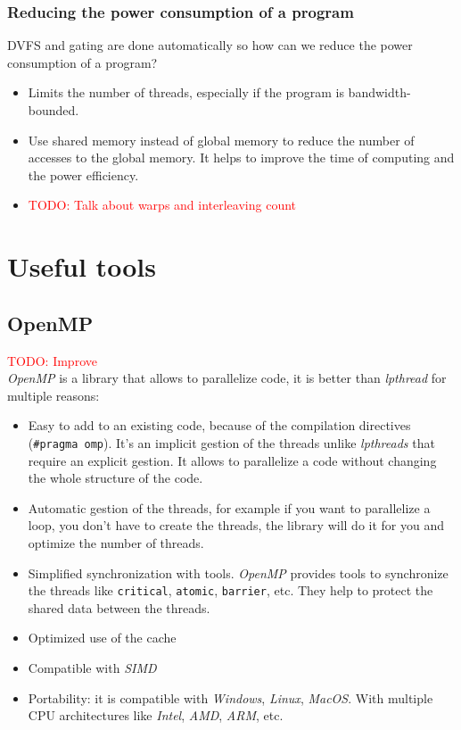 \documentclass[12pt, openany]{report}
\theoremstyle{definition}
\begin{document}
\subsection{Reducing the power consumption of a program}
DVFS and gating are done automatically so how can we reduce the power consumption of a program? 
\begin{itemize}
	\item Limits the number of threads, especially if the program is bandwidth-bounded.
	\item Use shared memory instead of global memory to reduce the number of accesses to the global memory. It helps to improve the time of computing and the power efficiency.
	\item \textcolor{red}{TODO: Talk about warps and interleaving count}
\end{itemize}
\chapter{Useful tools}
\section{OpenMP}\label{OpenMP}
\textcolor{red}{TODO: Improve}\\
\textit{OpenMP} is a library that allows to parallelize code, it is better than \textit{lpthread} for multiple reasons:
\begin{itemize}
	\item Easy to add to an existing code, because of the compilation directives (\texttt{\#pragma omp}). It's an implicit gestion of the threads unlike \textit{lpthreads} that require an explicit gestion. It allows to parallelize a code without changing the whole structure of the code.
	\item Automatic gestion of the threads, for example if you want to parallelize a loop, you don't have to create the threads, the library will do it for you and optimize the number of threads.
	\item Simplified synchronization with tools. \textit{OpenMP} provides tools to synchronize the threads like \texttt{critical}, \texttt{atomic}, \texttt{barrier}, etc. They help to protect the shared data between the threads.
	\item Optimized use of the cache
	\item Compatible with \textit{SIMD}
	\item Portability: it is compatible with \textit{Windows}, \textit{Linux}, \textit{MacOS}. With multiple CPU architectures like \textit{Intel}, \textit{AMD}, \textit{ARM}, etc.
\end{itemize}
\end{document}
